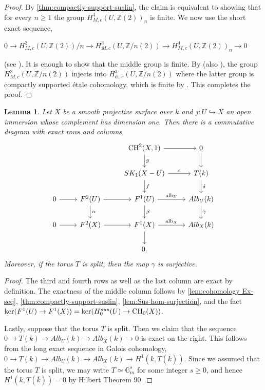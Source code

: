\documentclass[12pt]{amsart}
\newtheorem{lem}[lem]{Lemma}
\theoremstyle{remark}
\newcommand{\G}{{\mathbb G}}
\renewcommand{\1}{{\mathbb{S}}}
\newcommand{\alb}{{\rm alb}}
\newcommand{\CH}{{\rm CH}}
\newcommand{\<}{\langle}
\renewcommand{\>}{\rangle}
\begin{document}
\begin{proof}
By \autoref{thm:compactly-support-suslin}, the claim is equivalent to showing that for every $n\geq 1$ the group $H^4_{M,c}(U, \mathbb{Z}(2))_{n}$ is finite. We now use the short exact sequence,

\begin{center}
    $0 \rightarrow H^3_{M,c}(U, \mathbb{Z}(2))/n \rightarrow H^3_{M,c}(U, \mathbb{Z}/n(2)) \rightarrow H^4_{M,c}(U, \mathbb{Z}(2))_{n} \rightarrow 0$
\end{center}
(see \cite[(2.1.1)]{Yam1}). It is enough to show that the middle group is finite. By \cite[Corollary 10.3]{GKR} (also  \cite[Proposition 3.2]{Yam1}), the group $H^3_{M,c}(U, \mathbb{Z}/n(2))$ injects into $H^3_{\text{ét},c}(U, \mathbb{Z}/n(2))$ where the latter group is compactly supported \'{e}tale cohomology, which is finite by \cite[Lemma 2.9]{Sai-Duality}. This completes the proof.

\end{proof}






\begin{lem}\label{lem:maindiagram} Let $X$ be a smooth projective surface over $k$ and $j:U\hookrightarrow X$ an open immersion whose complement has dimension one. Then there is a commutative diagram with exact rows and columns, 
    \[
\begin{tikzcd}
&     & \CH^2(X,1) \arrow[r] \arrow[d, "g"] & 0 \arrow[d] \\
&     & SK_1(X-U) \arrow[r, "\varepsilon"] \arrow[d, "f"] & T(k) \arrow[d, "\delta"] \\
	0 \arrow[r] & F^{2}(U) \arrow[r] \arrow[d, "\alpha"] & F^{1}(U) \arrow[r, "\alb_U"] \arrow[d, "\beta"] & Alb_{U}(k) \arrow[d, "\gamma"] \\
	0 \arrow[r] & F^{2}(X) \arrow[r]                 & F^1(X)  \arrow[r, "\alb_X"]    \arrow[d]             & Alb_{X}(k) \\
	 &                  & 0.   & 
\end{tikzcd}
\] 
Moreover, if the torus $T$ is split, then the map $\gamma$ is surjective. 
\end{lem}




\begin{proof}
The third and fourth rows as well as the last column are exact by definition. The exactness of the middle column  follows by \autoref{lem:cohomology Ex-seq}, \autoref{thm:compactly-support-suslin}, \autoref{lem:Sus-hom-surjection}, and the fact  $\ker(F^{1}(U) \rightarrow F^{1}(X)) = \ker(H_{0}^{sus}(U) \rightarrow \CH_{0}(X))$.


Lastly, suppose that the torus $T$ is split. Then we claim that the sequence $0\to T(k)\to Alb_U(k)\to Alb_X(k)\to 0$ is exact on the right. This follows from the long exact sequence in Galois cohomology,
$0\to T(k)\to Alb_U(k)\to Alb_X(k)\to H^1(k, T(\overline{k}))$.  Since we assumed that the torus $T$ is split, we may write $T\simeq\G_m^s$ for some integer $s\geq 0$, and hence $H^1(k, T(\overline{k}))=0$ by Hilbert Theorem 90. 
    
\end{proof}
\end{document}
